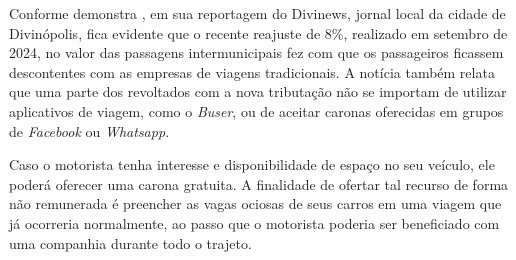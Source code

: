 Conforme demonstra , em sua reportagem do Divinews, jornal local da cidade de Divinópolis, fica evidente que o recente reajuste de 8\%, realizado em setembro de 2024, no valor das passagens intermunicipais fez com que os passageiros ficassem descontentes  com as empresas de viagens tradicionais. A notícia também relata que uma parte dos revoltados com a nova tributação não se importam de utilizar aplicativos de viagem, como o \textit{Buser}, ou de aceitar caronas oferecidas em grupos de \textit{Facebook} ou \textit{Whatsapp.}

Caso o motorista tenha interesse e disponibilidade de espaço no seu veículo, ele poderá oferecer uma carona gratuita. A finalidade de ofertar tal recurso de forma não remunerada é preencher as vagas ociosas de seus carros em uma viagem que já ocorreria normalmente, ao passo que o motorista poderia ser beneficiado com uma companhia durante todo o trajeto.



